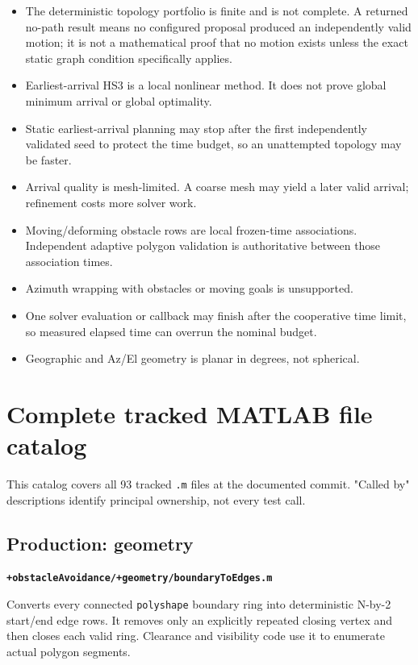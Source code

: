 \documentclass[10pt,letterpaper]{article}
\newcommand{\file}[1]{\nolinkurl{#1}}
\newcommand{\scriptentry}[2]{%
  \par\medskip\noindent\textbf{\file{#1}}\par
  \begingroup\raggedright #2\par\endgroup
}
\begin{document}
\begin{itemize}
  \item The deterministic topology portfolio is finite and is not complete.
  A returned no-path result means no configured proposal produced an
  independently valid motion; it is not a mathematical proof that no motion
  exists unless the exact static graph condition specifically applies.
  \item Earliest-arrival HS3 is a local nonlinear method. It does not prove
  global minimum arrival or global optimality.
  \item Static earliest-arrival planning may stop after the first independently
  validated seed to protect the time budget, so an unattempted topology may be
  faster.
  \item Arrival quality is mesh-limited. A coarse mesh may yield a later valid
  arrival; refinement costs more solver work.
  \item Moving/deforming obstacle rows are local frozen-time associations.
  Independent adaptive polygon validation is authoritative between those
  association times.
  \item Azimuth wrapping with obstacles or moving goals is unsupported.
  \item One solver evaluation or callback may finish after the cooperative
  time limit, so measured elapsed time can overrun the nominal budget.
  \item Geographic and Az/El geometry is planar in degrees, not spherical.
\end{itemize}

\section{Complete tracked MATLAB file catalog}\label{sec:inventory}

This catalog covers all 93 tracked \file{.m} files at the documented commit.
"Called by" descriptions identify principal ownership, not every test call.

\subsection{Production: geometry}

\scriptentry{+obstacleAvoidance/+geometry/boundaryToEdges.m}{Converts every
connected \file{polyshape} boundary ring into deterministic N-by-2 start/end
edge rows. It removes only an explicitly repeated closing vertex and then
closes each valid ring. Clearance and visibility code use it to enumerate
actual polygon segments.}
\end{document}
